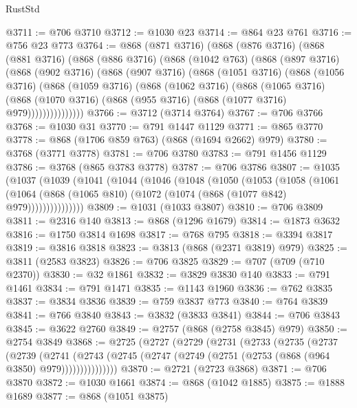 \begin{lexlean}{RustStd}
\begin{coremodule}
@3711 := @706 @3710
@3712 := @1030 @23
@3714 := @864 @23 @761
@3716 := @756 @23 @773
@3764 := @868
    (@871 @3716)
    (@868
      (@876 @3716)
      (@868
        (@881 @3716)
        (@868
          (@886 @3716)
          (@868
            (@1042 @763)
            (@868
              (@897 @3716)
              (@868
                (@902 @3716)
                (@868
                  (@907 @3716)
                  (@868
                    (@1051 @3716)
                    (@868
                      (@1056 @3716)
                      (@868
                        (@1059 @3716)
                        (@868
                          (@1062 @3716)
                          (@868
                            (@1065 @3716)
                            (@868
                              (@1070 @3716)
                              (@868 (@955 @3716) (@868 (@1077 @3716) @979)))))))))))))))
@3766 := @3712 (@3714 @3764)
@3767 := @706 @3766
@3768 := @1030 @31
@3770 := @791 @1447 @1129
@3771 := @865 @3770
@3778 := @868 (@1706 @859 @763) (@868 (@1694 @2662) @979)
@3780 := @3768 (@3771 @3778)
@3781 := @706 @3780
@3783 := @791 @1456 @1129
@3786 := @3768 (@865 @3783 @3778)
@3787 := @706 @3786
@3807 := @1035
    (@1037
      (@1039
        (@1041
          (@1044
            (@1046
              (@1048
                (@1050
                  (@1053
                    (@1058
                      (@1061
                        (@1064
                          (@868 (@1065 @810) (@1072 (@1074 (@868 (@1077 @842) @979)))))))))))))))
@3809 := @1031 (@1033 @3807)
@3810 := @706 @3809
@3811 := @2316 @140
@3813 := @868 (@1296 @1679)
@3814 := @1873 @3632
@3816 := @1750 @3814 @1698
@3817 := @768 @795
@3818 := @3394 @3817
@3819 := @3816 @3818
@3823 := @3813 (@868 (@2371 @3819) @979)
@3825 := @3811 (@2583 @3823)
@3826 := @706 @3825
@3829 := @707 (@709 (@710 @2370))
@3830 := @32 @1861
@3832 := @3829 @3830 @140
@3833 := @791 @1461
@3834 := @791 @1471
@3835 := @1143 @1960
@3836 := @762 @3835
@3837 := @3834 @3836
@3839 := @759 @3837 @773
@3840 := @764 @3839
@3841 := @766 @3840
@3843 := @3832 (@3833 @3841)
@3844 := @706 @3843
@3845 := @3622 @2760
@3849 := @2757 (@868 (@2758 @3845) @979)
@3850 := @2754 @3849
@3868 := @2725
    (@2727
      (@2729
        (@2731
          (@2733
            (@2735
              (@2737
                (@2739
                  (@2741
                    (@2743 (@2745 (@2747 (@2749 (@2751 (@2753 (@868 (@964 @3850) @979)))))))))))))))
@3870 := @2721 (@2723 @3868)
@3871 := @706 @3870
@3872 := @1030 @1661
@3874 := @868 (@1042 @1885)
@3875 := @1888 @1689
@3877 := @868 (@1051 @3875)

\end{coremodule}
\end{lexlean}
